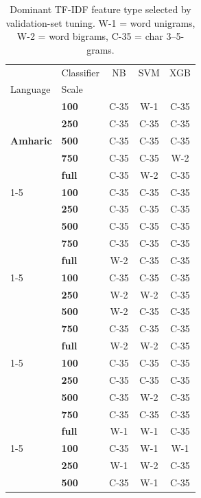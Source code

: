 \begin{table}[t]
\caption{Dominant TF-IDF feature type selected by validation-set tuning. W-1 = word unigrams, W-2 = word bigrams, C-35 = char 3--5-grams.}
\label{tab:feature_wins}
\begin{tabular}{llccc}
\toprule
 & Classifier & NB & SVM & XGB \\
Language & Scale &  &  &  \\
\midrule
\multirow[t]{5}{*}{\textbf{Amharic}} & \textbf{100} & C-35 & W-1 & C-35 \\
\textbf{} & \textbf{250} & C-35 & C-35 & C-35 \\
\textbf{} & \textbf{500} & C-35 & C-35 & C-35 \\
\textbf{} & \textbf{750} & C-35 & C-35 & W-2 \\
\textbf{} & \textbf{full} & C-35 & W-2 & C-35 \\
\cline{1-5}
\multirow[t]{5}{*}{\textbf{Hausa}} & \textbf{100} & C-35 & C-35 & C-35 \\
\textbf{} & \textbf{250} & C-35 & C-35 & C-35 \\
\textbf{} & \textbf{500} & C-35 & C-35 & C-35 \\
\textbf{} & \textbf{750} & C-35 & C-35 & C-35 \\
\textbf{} & \textbf{full} & W-2 & C-35 & C-35 \\
\cline{1-5}
\multirow[t]{5}{*}{\textbf{Igbo}} & \textbf{100} & C-35 & C-35 & C-35 \\
\textbf{} & \textbf{250} & W-2 & W-2 & C-35 \\
\textbf{} & \textbf{500} & W-2 & C-35 & C-35 \\
\textbf{} & \textbf{750} & C-35 & C-35 & C-35 \\
\textbf{} & \textbf{full} & W-2 & W-2 & C-35 \\
\cline{1-5}
\multirow[t]{5}{*}{\textbf{Oromo}} & \textbf{100} & C-35 & C-35 & C-35 \\
\textbf{} & \textbf{250} & C-35 & C-35 & C-35 \\
\textbf{} & \textbf{500} & C-35 & W-2 & C-35 \\
\textbf{} & \textbf{750} & C-35 & C-35 & C-35 \\
\textbf{} & \textbf{full} & W-1 & W-1 & C-35 \\
\cline{1-5}
\multirow[t]{5}{*}{\textbf{Nig. Pidgin}} & \textbf{100} & C-35 & W-1 & W-1 \\
\textbf{} & \textbf{250} & W-1 & W-2 & C-35 \\
\textbf{} & \textbf{500} & C-35 & W-1 & C-35 \\

\end{tabular}
\end{table}
